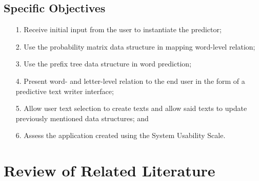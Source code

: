 \documentclass[journal]{./IEEE/IEEEtran}
\begin{document}
\subsection{Specific Objectives}
\begin{enumerate}{}

\item[1.] Receive initial input from the user to instantiate the predictor;

\item[2.] Use the probability matrix data structure in mapping word-level relation;

\item[3.] Use the prefix tree data structure in word prediction;

\item[4.] Present word- and letter-level relation to the end user in the form of a predictive text writer interface;

\item[5.] Allow user text selection to create texts and allow said texts to update previously mentioned data structures; and

\item[6.] Assess the application created using the System Usability Scale.

\end{enumerate}

\section{Review of Related Literature}




\end{document}
